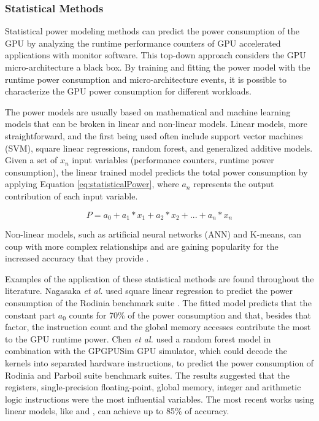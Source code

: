 \subsubsection{Statistical Methods}
\label{subsubsection:StatisticalMethods}

Statistical power modeling methods can predict the power consumption of the GPU by analyzing the runtime performance counters of GPU accelerated applications with monitor software. This top-down approach considers the GPU micro-architecture a black box. By training and fitting the power model with the runtime power consumption and micro-architecture events, it is possible to characterize the GPU power consumption for different workloads.

The power models are usually based on mathematical and machine learning models that can be broken in linear and non-linear models. Linear models, more straightforward, and the first being used often include support vector machines (SVM), square linear regressions, random forest, and generalized additive models.
Given a set of $x_n$ input variables (performance counters, runtime power consumption), the linear trained model predicts the total power consumption by applying Equation \ref{eq:statisticalPower}, where $a_n$ represents the output contribution of each input variable.

\begin{equation}
\label{eq:statisticalPower}
    P = a_0 + a_1 * x_1 + a_2 * x_2 + ... + a_n * x_n
\end{equation}

Non-linear models, such as artificial neural networks (ANN) and K-means, can coup with more complex relationships and are gaining popularity for the increased accuracy that they provide \cite{mei_survey_2016}. 

Examples of the application of these statistical methods are found throughout the literature. Nagasaka \textit{et al.} \cite{nagasaka_statistical_2010} used square linear regression to predict the power consumption of the Rodinia benchmark suite \cite{che_rodinia:_2009}. The fitted model predicts that the constant part $a_0$ counts for 70\% of the power consumption and that, besides that factor, the instruction count and the global memory accesses contribute the most to the GPU runtime power.  Chen \textit{et al.} \cite{chen_statistical_2011} used a random forest model in combination with the GPGPUSim GPU simulator, which could decode the kernels into separated hardware instructions, to predict the power consumption of Rodinia \cite{che_rodinia:_2009} and Parboil suite \cite{stratton_parboil:_nodate} benchmark suites. The results suggested that the registers, single-precision floating-point, global memory, integer and arithmetic logic instructions were the most influential variables. The most recent works using linear models, like \cite{abe_power_2014} and \cite{ghosh_statistical_2013}, can achieve up to 85\% of accuracy.

